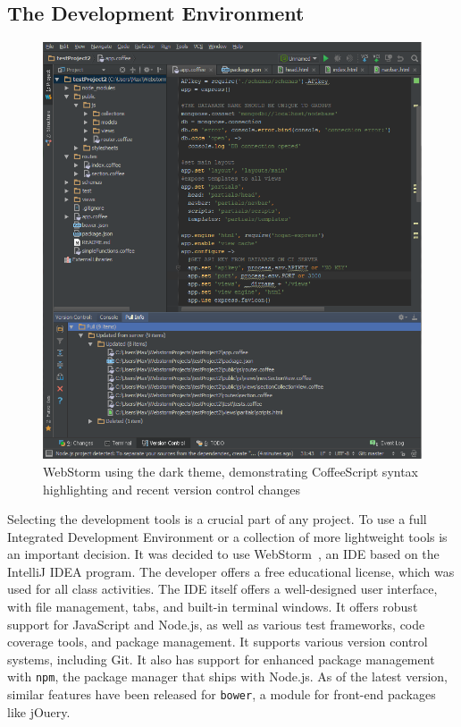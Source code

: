 \documentclass[12pt]{article}
\newcommand{\code}[1]{{\texttt {#1}}}
\begin{document}
\subsection{The Development Environment}\label{sec:IDE}
\begin{figure}[h!]
\includegraphics[width=\linewidth]{img/webstorm.png}
\caption{WebStorm using the dark theme, demonstrating CoffeeScript syntax highlighting and recent version control changes}
\end{figure}
Selecting the development tools is a crucial part of any project. 
To use a full Integrated Development Environment or a collection of more lightweight tools is an important decision. 
It was decided to use WebStorm~\cite{WebStorm}, an IDE based on the IntelliJ IDEA program. 
The developer offers a free educational license, which was used for all class activities. 
The IDE itself offers a well-designed user interface, with file management, tabs, and built-in terminal windows. 
It offers robust support for JavaScript and Node.js, as well as various test frameworks, code coverage tools, and package management. 
It supports various version control systems, including Git. 
It also has support for enhanced package management with \code{npm}, the package manager that ships with Node.js. 
As of the latest version, similar features have been released for \code{bower}, a module for front-end packages like jOuery.
\end{document}
